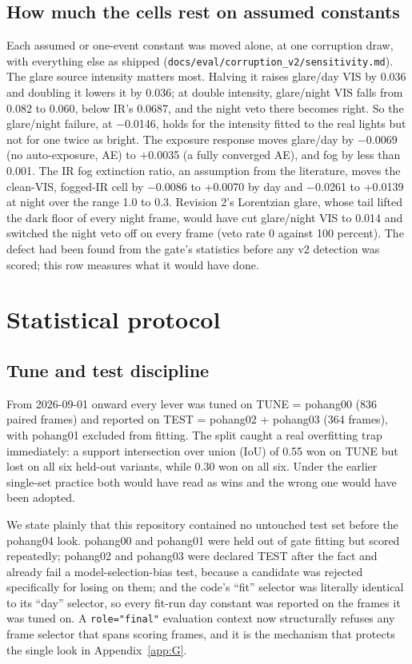 \documentclass[10pt]{article}
\begin{document}
\subsection{How much the cells rest on assumed constants}\label{app:B.2}
Each assumed or one-event constant was moved alone, at one corruption draw, with everything else as shipped (\texttt{docs/\allowbreak{}eval/\allowbreak{}corruption\_\allowbreak{}v2/\allowbreak{}sensitivity.md}). The glare source intensity matters most. Halving it raises glare/day VIS by 0.036 and doubling it lowers it by 0.036; at double intensity, glare/night VIS falls from 0.082 to 0.060, below IR's 0.0687, and the night veto there becomes right. So the glare/night failure, at $-$0.0146, holds for the intensity fitted to the real lights but not for one twice as bright. The exposure response moves glare/day by $-$0.0069 (no auto-exposure, AE) to +0.0035 (a fully converged AE), and fog by less than 0.001. The IR fog extinction ratio, an assumption from the literature, moves the clean-VIS, fogged-IR cell by $-$0.0086 to +0.0070 by day and $-$0.0261 to +0.0139 at night over the range 1.0 to 0.3. Revision 2's Lorentzian glare, whose tail lifted the dark floor of every night frame, would have cut glare/night VIS to 0.014 and switched the night veto off on every frame (veto rate 0 against 100 percent). The defect had been found from the gate's statistics before any v2 detection was scored; this row measures what it would have done.

\FloatBarrier
\section{Statistical protocol}\label{app:C}
\subsection{Tune and test discipline}\label{app:C.1}
From 2026-09-01 onward every lever was tuned on TUNE = pohang00 (836 paired frames) and reported on TEST = pohang02 + pohang03 (364 frames), with pohang01 excluded from fitting. The split caught a real overfitting trap immediately: a support intersection over union (IoU) of 0.55 won on TUNE but lost on all six held-out variants, while 0.30 won on all six. Under the earlier single-set practice both would have read as wins and the wrong one would have been adopted.

We state plainly that this repository contained no untouched test set before the pohang04 look. pohang00 and pohang01 were held out of gate fitting but scored repeatedly; pohang02 and pohang03 were declared TEST after the fact and already fail a model-selection-bias test, because a candidate was rejected specifically for losing on them; and the code's ``fit'' selector was literally identical to its ``day'' selector, so every fit-run day constant was reported on the frames it was tuned on. A \texttt{role="final"} evaluation context now structurally refuses any frame selector that spans scoring frames, and it is the mechanism that protects the single look in Appendix~\ref{app:G}.
\end{document}
